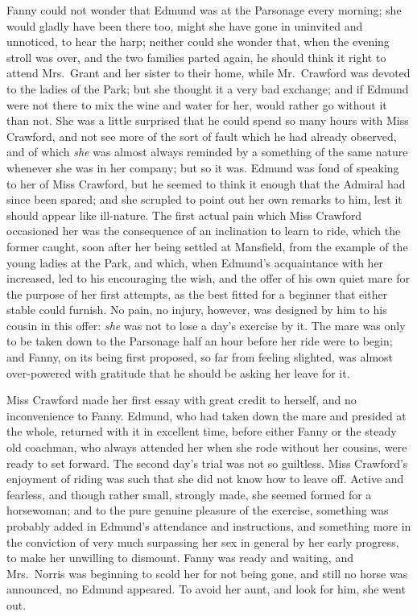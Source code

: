 \documentclass{article}
\begin{document}
Fanny could not wonder that Edmund was at the Parsonage
every morning; she would gladly have been there too,
might she have gone in uninvited and unnoticed, to hear
the harp; neither could she wonder that, when the evening
stroll was over, and the two families parted again,
he should think it right to attend Mrs.\ Grant and her
sister to their home, while Mr.\ Crawford was devoted
to the ladies of the Park; but she thought it a very
bad exchange; and if Edmund were not there to mix the wine
and water for her, would rather go without it than not.
She was a little surprised that he could spend so many
hours with Miss Crawford, and not see more of the sort
of fault which he had already observed, and of which \emph{she}
was almost always reminded by a something of the same
nature whenever she was in her company; but so it was.
Edmund was fond of speaking to her of Miss Crawford,
but he seemed to think it enough that the Admiral had
since been spared; and she scrupled to point out her own
remarks to him, lest it should appear like ill-nature.
The first actual pain which Miss Crawford occasioned her
was the consequence of an inclination to learn to ride,
which the former caught, soon after her being settled
at Mansfield, from the example of the young ladies at the Park,
and which, when Edmund's acquaintance with her increased,
led to his encouraging the wish, and the offer of his own
quiet mare for the purpose of her first attempts, as the best
fitted for a beginner that either stable could furnish.
No pain, no injury, however, was designed by him to his
cousin in this offer:  \emph{she} was not to lose a day's exercise
by it.  The mare was only to be taken down to the Parsonage
half an hour before her ride were to begin; and Fanny,
on its being first proposed, so far from feeling slighted,
was almost over-powered with gratitude that he should be
asking her leave for it.

Miss Crawford made her first essay with great credit
to herself, and no inconvenience to Fanny.  Edmund,
who had taken down the mare and presided at the whole,
returned with it in excellent time, before either Fanny
or the steady old coachman, who always attended her when
she rode without her cousins, were ready to set forward.
The second day's trial was not so guiltless.  Miss Crawford's
enjoyment of riding was such that she did not know how to
leave off.  Active and fearless, and though rather small,
strongly made, she seemed formed for a horsewoman; and to
the pure genuine pleasure of the exercise, something was
probably added in Edmund's attendance and instructions,
and something more in the conviction of very much surpassing
her sex in general by her early progress, to make her
unwilling to dismount.  Fanny was ready and waiting,
and Mrs.\ Norris was beginning to scold her for not being gone,
and still no horse was announced, no Edmund appeared.
To avoid her aunt, and look for him, she went out.
\end{document}
